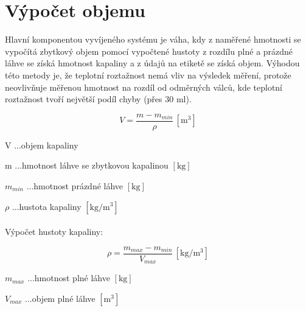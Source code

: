 \section{Výpočet objemu}
Hlavní komponentou vyvíjeného systému je váha, kdy z naměřené hmotnosti se vypočítá zbytkový objem pomocí vypočtené hustoty z rozdílu plné a prázdné láhve se získá hmotnost kapaliny a z údajů na etiketě se získá objem. Výhodou této metody je, že teplotní roztažnost nemá vliv na výsledek měření, protože neovlivňuje měřenou hmotnost na rozdíl od odměrných válců, kde teplotní roztažnost tvoří největší podíl chyby (přes 30 ml).


\begin{equation}
    V = \frac{m - m_{min}}{\rho} \, \left[\mathrm{m^3}\right] \label{objem_kapalina}
\end{equation}

V ...objem kapaliny

m ...hmotnost láhve se zbytkovou kapalinou \([\mathrm{kg}]\)

\(m_{min}\) ...hmotnost prázdné láhve \([\mathrm{kg}]\)

\(\rho\) ...hustota kapaliny \([\mathrm{kg/m^3}]\)
\\
\\
Výpočet hustoty kapaliny:

\begin{equation}
    \rho = \frac{m_{max} - m_{min}}{V_{max}} \, \left[\mathrm{kg/m^3}\right] \label{objem_kapalina}
\end{equation}


\(m_{max}\) ...hmotnost plné láhve \([\mathrm{kg}]\)

\(V_{max}\) ...objem plné láhve \([\mathrm{m^3}]\)
\bigskip


